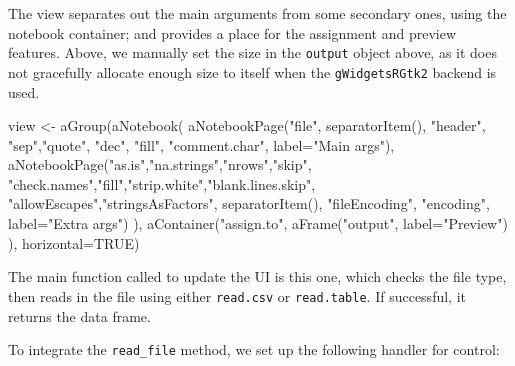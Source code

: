 \documentclass{article}
\newcommand{\code}[1]{\texttt{#1}} %
\newcommand{\pkg}[1]{\texttt{#1}}
\begin{document}
The view separates out the main arguments from some secondary ones,
using the notebook container; and provides a place for the assignment
and preview features. Above, we manually set the size in the \code{output}
object above, as
it does not gracefully allocate enough size to itself when the
\pkg{gWidgetsRGtk2} backend is used.
\begin{Schunk}
\begin{Sinput}
 view <- aGroup(aNotebook(
                          aNotebookPage("file",
                                        separatorItem(),
                                        "header", "sep","quote",
                                        "dec", "fill", "comment.char",
                                        label="Main args"),
                          aNotebookPage("as.is","na.strings","nrows","skip",
                                        "check.names","fill","strip.white","blank.lines.skip",
                                        "allowEscapes","stringsAsFactors",
                                        separatorItem(),
                                        "fileEncoding", "encoding",
                                        label="Extra args")
                          ),
                aContainer("assign.to",
                           aFrame("output", label="Preview")
                           ), 
                horizontal=TRUE)
\end{Sinput}
\end{Schunk}

The main function called to update the UI is this one, which 
checks the file type, then reads in the file using either
\code{read.csv} or \code{read.table}. If successful, it returns the
data frame.
\begin{Schunk}
\end{Schunk}

To integrate the \code{read\_file} method, we set up the following
handler for control:

\begin{Schunk}
\end{Schunk}
\end{document}
